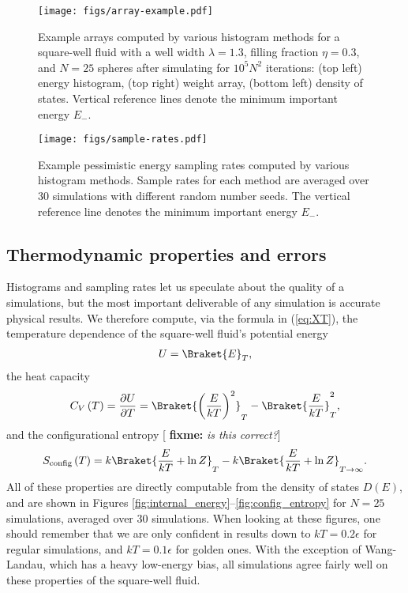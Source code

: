 \documentclass[11pt]{article}
\newcommand{\bk}{\Braket} %
\renewcommand{\t}{\text} %
\newcommand{\f}[2]{\dfrac{#1}{#2}} %
\newcommand{\p}[1]{\left(#1\right)} %
\newcommand{\red}[1]{{\bf \color{red} #1}}
\newcommand{\fixme}[1]{[\red{fixme:} \emph{#1}]}
\begin{document}
\begin{figure}
  \centering
  \texttt{[image: figs/array-example.pdf]}
  \caption[Example arrays]
  {Example arrays computed by various histogram methods for a
    square-well fluid with a well width $\lambda=1.3$, filling
    fraction $\eta=0.3$, and $N=25$ spheres after simulating for
    $10^5N^2$ iterations: (top left) energy histogram, (top right)
    weight array, (bottom left) density of states. Vertical reference
    lines denote the minimum important energy $E_-$.}
  \label{fig:arrays}
\end{figure}

\begin{figure}
  \centering
  \texttt{[image: figs/sample-rates.pdf]}
  \caption[Example energy sampling rates]
  {Example pessimistic energy sampling rates computed by various
    histogram methods. Sample rates for each method are averaged over
    30 simulations with different random number seeds. The vertical
    reference line denotes the minimum important energy $E_-$.}
  \label{fig:sample_rates}
\end{figure}

\subsection{Thermodynamic properties and errors}
\label{sec:properties}

Histograms and sampling rates let us speculate about the quality of a
simulations, but the most important deliverable of any simulation is
accurate physical results. We therefore compute, via the formula in
(\ref{eq:XT}), the temperature dependence of the square-well fluid's
potential energy
\begin{align}
  U=\bk{E}_T,
  \label{eq:U}
\end{align}
the heat capacity
\begin{align}
  C_V\p{T}=\f{\partial U}{\partial T}
  =\bk{\p{\f{E}{kT}}^2}_T-\bk{\f{E}{kT}}_T^2,
  \label{eq:CV}
\end{align}
and the configurational entropy \fixme{is this correct?}
\begin{align}
  S_{\t{config}}\p{T}=k\bk{\f{E}{kT}+\ln Z}_T
  -k\bk{\f{E}{kT}+\ln Z}_{T\to\infty}.
  \label{eq:S}
\end{align}
All of these properties are directly computable from the density of
states $D\p{E}$, and are shown in Figures
\ref{fig:internal_energy}--\ref{fig:config_entropy} for $N=25$
simulations, averaged over 30 simulations. When looking at these
figures, one should remember that we are only confident in results
down to $kT=0.2\epsilon$ for regular simulations, and $kT=0.1\epsilon$
for golden ones. With the exception of Wang-Landau, which has a heavy
low-energy bias, all simulations agree fairly well on these properties
of the square-well fluid.
\end{document}
